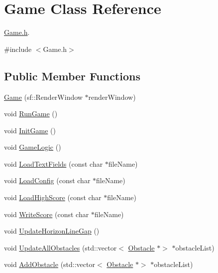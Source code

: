 \hypertarget{class_game}{}\section{Game Class Reference}
\label{class_game}


\mbox{\hyperlink{_game_8h_source}{Game.\+h}}.  




{\ttfamily \#include $<$Game.\+h$>$}

\subsection*{Public Member Functions}
\begin{DoxyCompactItemize}
\item 
\mbox{\hyperlink{class_game_acfc33e4d3763b99843261d6f9c0a192c}{Game}} (sf\+::\+Render\+Window $\ast$render\+Window)
\item 
void \mbox{\hyperlink{class_game_aa7f79908f4a73b4affe1f7143fbe8fe1}{Run\+Game}} ()
\item 
void \mbox{\hyperlink{class_game_a343f029e4473cb18c93427620bb1ab29}{Init\+Game}} ()
\item 
void \mbox{\hyperlink{class_game_a362e7602108145252ff00a0d46a08570}{Game\+Logic}} ()
\item 
void \mbox{\hyperlink{class_game_a28b0ecbf20b95b6e910cd2b0a9581c69}{Load\+Text\+Fields}} (const char $\ast$file\+Name)
\item 
void \mbox{\hyperlink{class_game_ac23a2dbd9c1a1a22bf1e8a6d36d93653}{Load\+Config}} (const char $\ast$file\+Name)
\item 
void \mbox{\hyperlink{class_game_a120d03b55162ebdf60d5b3dbd8dba3c5}{Load\+High\+Score}} (const char $\ast$file\+Name)
\item 
void \mbox{\hyperlink{class_game_ae59d28483bdb8b832186dc70f2ebc6a8}{Write\+Score}} (const char $\ast$file\+Name)
\item 
void \mbox{\hyperlink{class_game_a11973be88ac6d1d31d32267e31917901}{Update\+Horizon\+Line\+Gap}} ()
\item 
void \mbox{\hyperlink{class_game_a347a4d559fbd7c69f99451ebb084f5c4}{Update\+All\+Obstacles}} (std\+::vector$<$ \mbox{\hyperlink{class_obstacle}{Obstacle}} $\ast$$>$ $\ast$obstacle\+List)
\item 
void \mbox{\hyperlink{class_game_aa36f190cadcc46da84557adf1229e064}{Add\+Obstacle}} (std\+::vector$<$ \mbox{\hyperlink{class_obstacle}{Obstacle}} $\ast$$>$ $\ast$obstacle\+List)
\item 

\end{DoxyCompactItemize}
